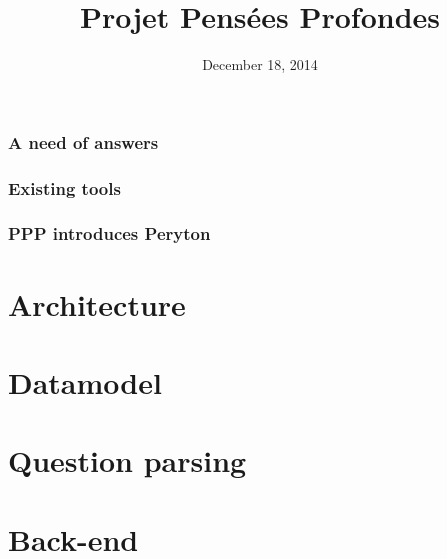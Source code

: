 \documentclass[10pt, compress]{beamer}
\title{Projet Pensées Profondes}
\subtitle{}
\date{December 18, 2014}
\institute{École Normale Supérieure de Lyon}
\begin{document}
\maketitle

\begin{frame}[fragile]
    \frametitle{A need of answers}
\end{frame}

\begin{frame}[fragile]
    \frametitle{Existing tools}
\end{frame}

\begin{frame}[fragile]
    \frametitle{PPP introduces Peryton}
\end{frame}

\section{Architecture}
\begin{frame}[fragile]
    \begin{figure}
        \resizebox{.9\linewidth}{!}{
            
        }
    \end{figure}
\end{frame}

\section{Datamodel}

\section{Question parsing}

\section{Back-end}

\end{document}
